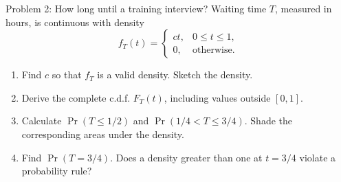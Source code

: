 \documentclass[notes,10pt, aspectratio=169]{beamer}
\begin{document}
\begin{frame}{Problem 2: How long until a training interview?}
Waiting time $T$, measured in hours, is continuous with density
\[
f_T(t)=\begin{cases}ct,&0\leq t\leq1,\\0,&\text{otherwise.}\end{cases}
\]
\begin{enumerate}
\setlength{\itemsep}{7pt}
\item Find $c$ so that $f_T$ is a valid density. Sketch the density.
\item Derive the complete c.d.f. $F_T(t)$, including values outside $[0,1]$.
\item Calculate $\Pr(T\leq1/2)$ and $\Pr(1/4<T\leq3/4)$. Shade the corresponding areas under the density.
\item Find $\Pr(T=3/4)$. Does a density greater than one at $t=3/4$ violate a probability rule?
\end{enumerate}
\end{frame}
\end{document}
